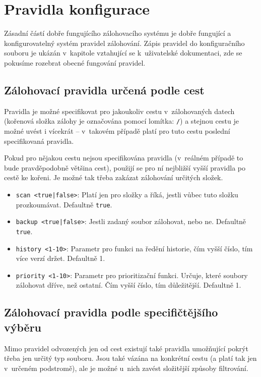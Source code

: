 \section{Pravidla konfigurace}

Zásadní částí dobře fungujícího zálohovacího systému je dobře fungující
a konfigurovatelný systém pravidel zálohování. Zápis pravidel do konfiguračního
souboru je ukázán v~kapitole vztahující se k~uživatelské dokumentaci, zde se
pokusíme rozebrat obecné fungování pravidel.

\subsection{Zálohovací pravidla určená podle cest}

Pravidla je možné specifikovat pro jakoukoliv cestu v~zálohovaných datech
(kořenová složka zálohy je označována pomocí lomítka: \texttt{/}) a stejnou
cestu je možné uvést i vícekrát -- v~takovém případě platí pro tuto cestu
poslední specifikovaná pravidla.

Pokud pro nějakou cestu nejsou specifikována pravidla (v~reálném případě to bude
pravděpodobně většina cest), použijí se pro ní nejbližší vyšší pravidla po cestě
ke kořeni. Je možné tak třeba zakázat zálohování určitých složek.

\medskip

\begin{itemize}
	\item {\tt scan <true|false>}: Platí jen pro složky a říká, jestli vůbec
	tuto složku prozkoumávat. Defaultně {\tt true}.
	\item {\tt backup <true|false>}: Jestli zadaný soubor zálohovat, nebo
	ne. Defaultně {\tt true}.
	\item {\tt history <1-10>}: Parametr pro funkci na ředění historie, čím
	vyšší číslo, tím více verzí držet. Defaultně 1.
	\item {\tt priority <1-10>}: Parametr pro prioritizační funkci. Určuje,
	které soubory zálohovat dříve, než ostatní. Čím vyšší číslo, tím
	důležitější. Defaultně 1.
\end{itemize}

\subsection{Zálohovací pravidla podle specifičtějšího výběru}

Mimo pravidel odvozených jen od cest existují také pravidla umožňující pokrýt
třeba jen určitý typ souboru. Jsou také vázána na konkrétní cestu (a platí tak
jen v~určeném podstromě), ale je možné u~nich zavést složitější způsoby
filtrování.

